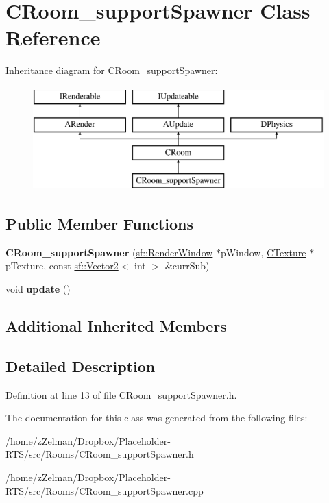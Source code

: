 \hypertarget{classCRoom__supportSpawner}{\section{C\-Room\-\_\-support\-Spawner Class Reference}
\label{classCRoom__supportSpawner}
}
Inheritance diagram for C\-Room\-\_\-support\-Spawner\-:\begin{figure}[H]
\begin{center}
\leavevmode
\includegraphics[height=4.000000cm]{classCRoom__supportSpawner}
\end{center}
\end{figure}
\subsection*{Public Member Functions}
\begin{DoxyCompactItemize}
\item 
\hypertarget{classCRoom__supportSpawner_a5a12aeb793bb19e9676e448a937f1426}{{\bfseries C\-Room\-\_\-support\-Spawner} (\hyperlink{classsf_1_1RenderWindow}{sf\-::\-Render\-Window} $\ast$p\-Window, \hyperlink{classCTexture}{C\-Texture} $\ast$p\-Texture, const \hyperlink{classsf_1_1Vector2}{sf\-::\-Vector2}$<$ int $>$ \&curr\-Sub)}\label{classCRoom__supportSpawner_a5a12aeb793bb19e9676e448a937f1426}

\item 
\hypertarget{classCRoom__supportSpawner_a509e95652394c868388b79b2e98d67f0}{void {\bfseries update} ()}\label{classCRoom__supportSpawner_a509e95652394c868388b79b2e98d67f0}

\end{DoxyCompactItemize}
\subsection*{Additional Inherited Members}


\subsection{Detailed Description}


Definition at line 13 of file C\-Room\-\_\-support\-Spawner.\-h.



The documentation for this class was generated from the following files\-:\begin{DoxyCompactItemize}
\item 
/home/z\-Zelman/\-Dropbox/\-Placeholder-\/\-R\-T\-S/src/\-Rooms/C\-Room\-\_\-support\-Spawner.\-h\item 
/home/z\-Zelman/\-Dropbox/\-Placeholder-\/\-R\-T\-S/src/\-Rooms/C\-Room\-\_\-support\-Spawner.\-cpp\end{DoxyCompactItemize}
